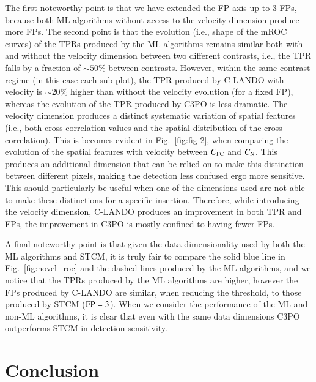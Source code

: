 \documentclass[referee]{aa} %
\begin{document}
The first noteworthy point is that we have extended the FP axis up to $3$ FPs, because both ML algorithms without access to the velocity dimension produce more FPs.
The second point is that the evolution (i.e., shape of the mROC curves) of the TPRs produced by the ML algorithms remains similar both with and without the velocity dimension between two different contrasts, i.e., the TPR falls by a fraction of $\sim 50\%$ between contrasts.
However, within the same contrast regime (in this case each sub plot), the TPR produced by C-LANDO with velocity is $\sim 20\%$ higher than without the velocity evolution (for a fixed FP), whereas the evolution of the TPR produced by C3PO is less dramatic.
The velocity dimension produces a distinct systematic variation of spatial features (i.e., both cross-correlation values and the spatial distribution of the cross-correlation).
This is becomes evident in Fig.~\ref{fig:fig-2}, when comparing the evolution of the spatial features with velocity between $C_{\rm FC}$ and $C_{\rm N}$.
This produces an additional dimension that can be relied on to make this distinction between different pixels, making the detection less confused ergo more sensitive.
This should particularly be useful when one of the dimensions used are not able to make these distinctions for a specific insertion.
Therefore, while introducing the velocity dimension, C-LANDO produces an improvement in both TPR and FPs, the improvement in C3PO is mostly confined to having fewer FPs.

A final noteworthy point is that given the data dimensionality used by both the ML algorithms and STCM, it is truly fair to compare the solid blue line in Fig.~\ref{fig:novel_roc} and the dashed lines produced by the ML algorithms, and we notice that the TPRs produced by the ML algorithms are higher, however the FPs produced by C-LANDO are similar, when reducing the threshold, to those produced by STCM (${\rm FP}=3$). 
When we consider the performance of the ML and non-ML algorithms, it is clear that even with the same data dimensions C3PO outperforms STCM in detection sensitivity.
\section{Conclusion}
\end{document}
